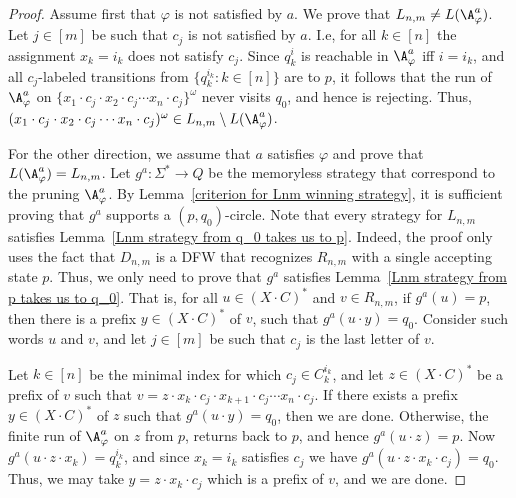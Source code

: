 \documentclass{lmcs}
\begin{document}
\begin{proof}
	Assume first that $\varphi$ is not satisfied by $a$. We prove that $L_{n,m}\neq L(\A^{a}_\varphi)$. Let $j\in [m]$ be such that $c_j$ is not satisfied by $a$. I.e, for all $k\in [n]$ the assignment $x_k=i_k$ does not satisfy $c_j$. Since $q^i_k$ is reachable in $\A_\varphi^{a}$ iff $i=i_k$, and all $c_j$-labeled transitions from $\{q^{i_k}_k : k\in[n]\}$ are to $p$, it follows that the run of $\A_\varphi^{a}$ on $\{x_1\cdot c_j\cdot x_2\cdot c_j\cdots x_n\cdot c_j\}^\omega$ never visits $q_0$, and hence is rejecting. Thus, $(x_1\cdot c_j\cdot x_2\cdot c_j\cdots x_n\cdot c_j)^\omega\in L_{n,m}\setminus L(\A_\varphi^{a})$.
	
	For the other direction, we assume that $a$ satisfies $\varphi$ and prove that $L(\A_\varphi^{a})=L_{n,m}$. Let $g^{a}:\Sigma^*\rightarrow Q$ be the memoryless strategy that correspond to the pruning $\A^{a}_\varphi$. By Lemma~\ref{criterion for Lnm winning strategy}, it is sufficient proving that $g^a$ supports a $(p,q_0)$-circle. Note that every strategy for $L_{n,m}$ satisfies Lemma~\ref{Lnm strategy from q_0 takes us to p}. Indeed, the proof only uses the fact that $D_{n,m}$ is a DFW that recognizes $R_{n,m}$ with a single accepting state $p$. Thus, we only need to prove that $g^a$ satisfies Lemma~\ref{Lnm strategy from p takes us to q_0}. That is, for all $u\in (X\cdot C)^*$ and $v\in R_{n,m}$, if $g^{a}(u)=p$, then there is a prefix $y\in (X\cdot C)^*$ of $v$, such that $g^{a}(u\cdot y)=q_0$. Consider such words $u$ and $v$, and let $j\in [m]$ be such that $c_j$ is the last letter of $v$. 
	
		Let $ k\in [n]$ be the minimal index for which $c_j\in C^{i_k}_k$, 
	and let $z\in (X\cdot C)^*$ be a prefix of $v$ such that $v=z\cdot x_k\cdot c_j\cdot x_{k+1}\cdot c_j\cdots x_n\cdot c_j$. If there exists a prefix $y\in (X\cdot C)^*$ of $ z$ such that $g^{a}(u\cdot y)=q_0$, then we are done. Otherwise, the finite run of $\A_\varphi^{a}$ on $ z $ from $ p $, returns back to $ p $, and hence $g^{a}(u\cdot z)=p$. Now $g^{a}(u\cdot z\cdot x_k)=q^{i_k}_k$, and since $x_k=i_k$ satisfies $c_j$ we have $g^{a}(u\cdot z\cdot x_k\cdot c_j)=q_0$. Thus, we may take $y=z\cdot x_k\cdot c_j$ which is a prefix of $v$, and we are done.
\end{proof}

 
\end{document}
